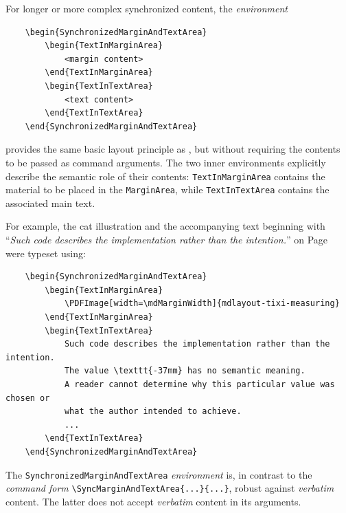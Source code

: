 \documentclass[
11pt,
a4paper,
oneside
]{scrbook}
\begin{document}
For longer or more complex synchronized content, the \emph{environment}
\begin{verbatim}
	\begin{SynchronizedMarginAndTextArea}
		\begin{TextInMarginArea}
			<margin content>
		\end{TextInMarginArea}
		\begin{TextInTextArea}
			<text content>
		\end{TextInTextArea}
	\end{SynchronizedMarginAndTextArea}
\end{verbatim}
provides the same basic layout principle as
\texttt{\string\SyncMarginAndTextArea}, but without requiring the
contents to be passed as command arguments.
The two inner environments explicitly describe the semantic role of
their contents: \texttt{TextInMarginArea} contains the material to be
placed in the \texttt{MarginArea}, while \texttt{TextInTextArea}
contains the associated main text.

For example, the cat illustration and the accompanying text beginning
with ``\emph{Such code describes the implementation rather than the
	intention.}'' on Page~\pageref{fig:mdlayout-tixi-measuring} were
typeset using:
\begin{verbatim}
	\begin{SynchronizedMarginAndTextArea}
		\begin{TextInMarginArea}
			\PDFImage[width=\mdMarginWidth]{mdlayout-tixi-measuring}
		\end{TextInMarginArea}
		\begin{TextInTextArea}
			Such code describes the implementation rather than the intention.
			The value \texttt{-37mm} has no semantic meaning.
			A reader cannot determine why this particular value was chosen or
			what the author intended to achieve.
			...
		\end{TextInTextArea}
	\end{SynchronizedMarginAndTextArea}
\end{verbatim}
\begin{note}
	The \texttt{SynchronizedMarginAndTextArea} \emph{environment} is, in contrast to
	the \emph{command form} \verb|\SyncMarginAndTextArea{...}{...}|, robust against
	\emph{verbatim} content.
	The latter does not accept \emph{verbatim} content in its arguments.
\end{note}

\end{document}
